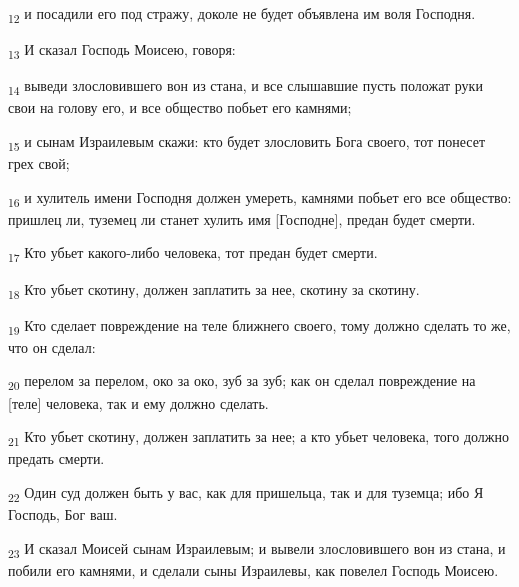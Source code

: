 \begin{tcolorbox}
\textsubscript{12} и посадили его под стражу, доколе не будет объявлена им воля Господня.
\end{tcolorbox}
\begin{tcolorbox}
\textsubscript{13} И сказал Господь Моисею, говоря:
\end{tcolorbox}
\begin{tcolorbox}
\textsubscript{14} выведи злословившего вон из стана, и все слышавшие пусть положат руки свои на голову его, и все общество побьет его камнями;
\end{tcolorbox}
\begin{tcolorbox}
\textsubscript{15} и сынам Израилевым скажи: кто будет злословить Бога своего, тот понесет грех свой;
\end{tcolorbox}
\begin{tcolorbox}
\textsubscript{16} и хулитель имени Господня должен умереть, камнями побьет его все общество: пришлец ли, туземец ли станет хулить имя [Господне], предан будет смерти.
\end{tcolorbox}
\begin{tcolorbox}
\textsubscript{17} Кто убьет какого-либо человека, тот предан будет смерти.
\end{tcolorbox}
\begin{tcolorbox}
\textsubscript{18} Кто убьет скотину, должен заплатить за нее, скотину за скотину.
\end{tcolorbox}
\begin{tcolorbox}
\textsubscript{19} Кто сделает повреждение на теле ближнего своего, тому должно сделать то же, что он сделал:
\end{tcolorbox}
\begin{tcolorbox}
\textsubscript{20} перелом за перелом, око за око, зуб за зуб; как он сделал повреждение на [теле] человека, так и ему должно сделать.
\end{tcolorbox}
\begin{tcolorbox}
\textsubscript{21} Кто убьет скотину, должен заплатить за нее; а кто убьет человека, того должно предать смерти.
\end{tcolorbox}
\begin{tcolorbox}
\textsubscript{22} Один суд должен быть у вас, как для пришельца, так и для туземца; ибо Я Господь, Бог ваш.
\end{tcolorbox}
\begin{tcolorbox}
\textsubscript{23} И сказал Моисей сынам Израилевым; и вывели злословившего вон из стана, и побили его камнями, и сделали сыны Израилевы, как повелел Господь Моисею.
\end{tcolorbox}
